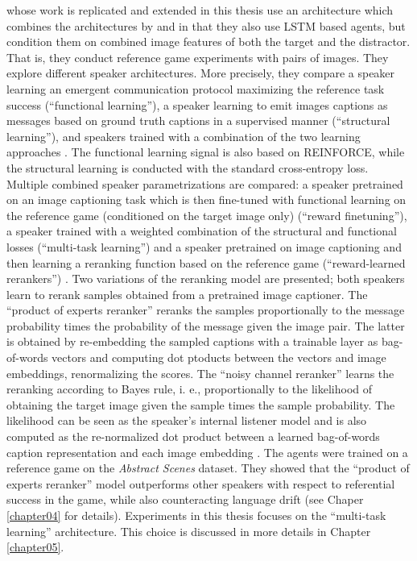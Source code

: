 \cite{lazaridou2020multi} whose work is replicated and extended in this thesis use an architecture which combines the architectures by \cite{lazaridou2016multi} and \cite{havrylov2017emergence} in that they also use LSTM based agents, but condition them on combined image features of both the target and the distractor. That is, they conduct reference game experiments with pairs of images. They explore different speaker architectures. More precisely, they compare a speaker learning an emergent communication protocol maximizing the reference task success (``functional learning''), a speaker learning to emit images captions as messages based on ground truth captions in a supervised manner (``structural learning''), and speakers trained with a combination of the two learning approaches \parencite[][p. 4]{lazaridou2020multi}. The functional learning signal is also based on REINFORCE, while the structural learning is conducted with the standard cross-entropy loss. Multiple combined speaker parametrizations are compared: a speaker pretrained on an image captioning task which is then fine-tuned with functional learning on the reference game (conditioned on the target image only) (``reward finetuning''), a speaker trained with a weighted combination of the structural and functional losses (``multi-task learning'') and a speaker pretrained on image captioning and then learning a reranking function based on the reference game (``reward-learned rerankers'') \parencite[][p. 4--5]{lazaridou2020multi}. Two variations of the reranking model are presented; both speakers learn to rerank samples obtained from a pretrained image captioner. The ``product of experts reranker'' reranks the samples proportionally to the message probability times the probability of the message given the image pair. The latter is obtained by re-embedding the sampled captions with a trainable layer as bag-of-words vectors and computing dot ptoducts between the vectors and image embeddings, renormalizing the scores.  The ``noisy channel reranker'' learns the reranking according to Bayes rule, i. e., proportionally to the likelihood of obtaining the target image given the sample times the sample probability. The likelihood can be seen as the speaker's internal listener model and is also computed as the re-normalized dot product between a learned bag-of-words caption representation and each image embedding \parencite[][p. 5--6]{lazaridou2020multi}. The agents were trained on a reference game on the \textit{Abstract Scenes} dataset.
They showed that the ``product of experts reranker'' model outperforms other speakers with respect to referential success in the game, while also counteracting language drift (see Chaper \ref{chapter04} for details). 
Experiments in this thesis focuses on the ``multi-task learning'' architecture. This choice is discussed in more details in Chapter \ref{chapter05}.

